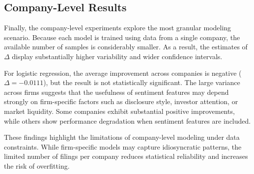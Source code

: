\subsection{Company-Level Results}

Finally, the company-level experiments explore the most granular modeling scenario. Because each model is trained using data from a single company, the available number of samples is considerably smaller. As a result, the estimates of $\Delta$ display substantially higher variability and wider confidence intervals.

For logistic regression, the average improvement across companies is negative ($\Delta = -0.0111$), but the result is not statistically significant. The large variance across firms suggests that the usefulness of sentiment features may depend strongly on firm-specific factors such as disclosure style, investor attention, or market liquidity. Some companies exhibit substantial positive improvements, while others show performance degradation when sentiment features are included.

These findings highlight the limitations of company-level modeling under data constraints. While firm-specific models may capture idiosyncratic patterns, the limited number of filings per company reduces statistical reliability and increases the risk of overfitting.


